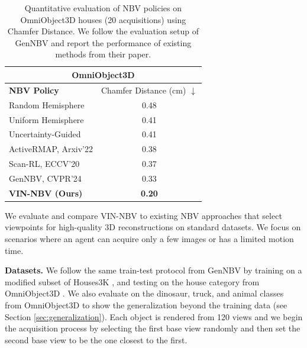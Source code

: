 \begin{table}
\vspace{0.75em}
  \centering
    \small
    \begin{tabular}{@{}lc@{}}
      \toprule
      \multicolumn{2}{c}{\textbf{OmniObject3D}} \\
      \midrule
      \textbf{NBV Policy} & Chamfer Distance (cm) $\downarrow$ \\
      \midrule
      Random Hemisphere   & 0.48 \\
      Uniform Hemisphere  & 0.41 \\
      \midrule
      Uncertainty-Guided  & 0.41 \\
      ActiveRMAP, Arxiv'22\cite{zhan2022activermapradiancefieldactive}          & 0.38 \\
      \midrule
      Scan-RL, ECCV'20\cite{peralta2020next} & 0.37 \\
      GenNBV, CVPR'24\cite{chen2024gennbv} & 0.33 \\
      \textbf{VIN-NBV (Ours)}      & \textbf{0.20} \\
      \bottomrule
    \end{tabular}
    \vspace{-0.25em}
    \caption{Quantitative evaluation of NBV policies on OmniObject3D \cite{wu2023omniobject3d} houses (20 acquisitions) using Chamfer Distance. We follow the evaluation setup of GenNBV and report the performance of existing methods from their paper.}
    \label{table:result_chamfer_distance}
  \vspace{0.5em}
\end{table}


We evaluate and compare VIN-NBV to existing NBV approaches that select viewpoints for high-quality 3D reconstructions on standard datasets. We focus on scenarios where an agent can acquire only a few images or has a limited motion time.

\noindent\textbf{Datasets.} We follow the same train-test protocol from GenNBV\cite{chen2024gennbv} by training on a modified subset of Houses3K \cite{peralta2020next}, and testing on the house category from OmniObject3D \cite{wu2023omniobject3d}. We also evaluate on the dinosaur, truck, and animal classes from OmniObject3D \cite{wu2023omniobject3d} to show the generalization beyond the training data (see Section \ref{sec:generalization}). Each object is rendered from 120 views and we begin the acquisition process by selecting the first base view randomly and then set the second base view to be the one closest to the first.

